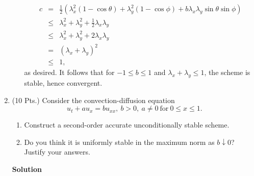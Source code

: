 \documentclass{article}
\begin{document}
\begin{enumerate}
\begin{enumerate}
\begin{eqnarray*}
c &   =  & \frac{1}{2} \left( \lambda_x^2 (1 - \cos \theta)
                            + \lambda_y^2 (1 - \cos \phi)
                            + b \lambda_x \lambda_y \sin \theta \sin \phi \right) \\
  & \leq & \lambda_x^2 + \lambda_y^2 + \frac{1}{2} \lambda_x \lambda_y \\
  & \leq & \lambda_x^2 + \lambda_y^2 + 2 \lambda_x \lambda_y \\
  &   =  & (\lambda_x + \lambda_y)^2 \\
  & \leq & 1,
\end{eqnarray*}
as desired.  It follows that for \(-1 \leq b \leq 1\) and \(\lambda_x + \lambda_y \leq 1\), the scheme is stable, hence convergent.

\end{enumerate}



\item (10 Pts.) Consider the convection-diffusion equation
\[u_t + a u_x = b u_{xx}, \ b > 0, \ a \neq 0 \ \text{for} \ 0 \leq x \leq 1.\]

\begin{enumerate}
\item Construct a second-order accurate unconditionally stable scheme.

\item Do you think it is uniformly stable in the maximum norm as \(b \downarrow 0\)?  Justify your answers.

\end{enumerate}

{\bf Solution}


\end{enumerate}
\end{document}
